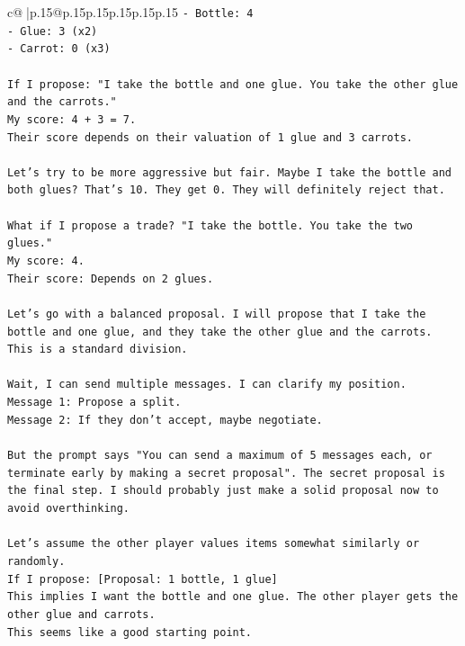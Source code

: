 \documentclass{article}
\begin{document}
{\begin{supertabular}{c@{$\;$}|p{.15\linewidth}@{}p{.15\linewidth}p{.15\linewidth}p{.15\linewidth}p{.15\linewidth}p{.15\linewidth}}
{{{\texttt{{-} Bottle: 4} \\
\texttt{{-} Glue: 3 (x2)} \\
\texttt{{-} Carrot: 0 (x3)} \\
\\ 
\texttt{If I propose: "I take the bottle and one glue. You take the other glue and the carrots."} \\
\texttt{My score: 4 + 3 = 7.} \\
\texttt{Their score depends on their valuation of 1 glue and 3 carrots.} \\
\\ 
\texttt{Let's try to be more aggressive but fair. Maybe I take the bottle and both glues? That's 10. They get 0. They will definitely reject that.} \\
\\ 
\texttt{What if I propose a trade? "I take the bottle. You take the two glues."} \\
\texttt{My score: 4.} \\
\texttt{Their score: Depends on 2 glues.} \\
\\ 
\texttt{Let's go with a balanced proposal. I will propose that I take the bottle and one glue, and they take the other glue and the carrots. This is a standard division.} \\
\\ 
\texttt{Wait, I can send multiple messages. I can clarify my position.} \\
\texttt{Message 1: Propose a split.} \\
\texttt{Message 2: If they don't accept, maybe negotiate.} \\
\\ 
\texttt{But the prompt says "You can send a maximum of 5 messages each, or terminate early by making a secret proposal". The secret proposal is the final step. I should probably just make a solid proposal now to avoid overthinking.} \\
\\ 
\texttt{Let's assume the other player values items somewhat similarly or randomly.} \\
\texttt{If I propose: {[}Proposal: 1 bottle, 1 glue{]}} \\
\texttt{This implies I want the bottle and one glue. The other player gets the other glue and carrots.} \\
\texttt{This seems like a good starting point.} \\
\\ 
}}}
\end{supertabular}}
\end{document}
